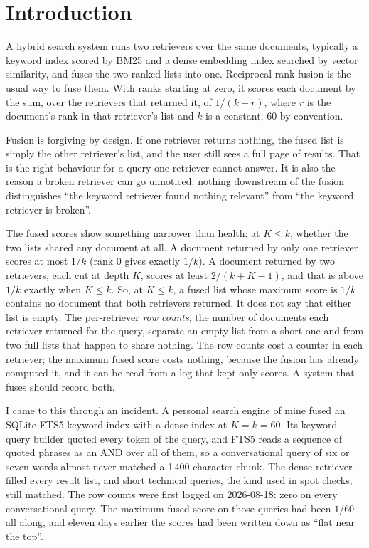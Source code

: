 \documentclass[11pt]{article}
\begin{document}
\section{Introduction}
\label{sec:intro}

A hybrid search system runs two retrievers over the same documents, typically a keyword index scored by BM25 and a dense embedding index searched by vector similarity, and fuses the two ranked lists into one. Reciprocal rank fusion \citep[RRF;][]{cormack2009rrf} is the usual way to fuse them. With ranks starting at zero, it scores each document by the sum, over the retrievers that returned it, of $1/(k+r)$, where $r$ is the document's rank in that retriever's list and $k$ is a constant, 60 by convention.

Fusion is forgiving by design. If one retriever returns nothing, the fused list is simply the other retriever's list, and the user still sees a full page of results. That is the right behaviour for a query one retriever cannot answer. It is also the reason a broken retriever can go unnoticed: nothing downstream of the fusion distinguishes ``the keyword retriever found nothing relevant'' from ``the keyword retriever is broken''.

The fused scores show something narrower than health: at $K \le k$, whether the two lists shared any document at all. A document returned by only one retriever scores at most $1/k$ (rank 0 gives exactly $1/k$). A document returned by two retrievers, each cut at depth $K$, scores at least $2/(k+K-1)$, and that is above $1/k$ exactly when $K \le k$. So, at $K \le k$, a fused list whose maximum score is $1/k$ contains no document that both retrievers returned. It does not say that either list is empty. The per-retriever \emph{row counts}, the number of documents each retriever returned for the query, separate an empty list from a short one and from two full lists that happen to share nothing. The row counts cost a counter in each retriever; the maximum fused score costs nothing, because the fusion has already computed it, and it can be read from a log that kept only scores. A system that fuses should record both.

I came to this through an incident. A personal search engine of mine fused an SQLite FTS5 keyword index with a dense index at $K = k = 60$. Its keyword query builder quoted every token of the query, and FTS5 reads a sequence of quoted phrases as an AND over all of them, so a conversational query of six or seven words almost never matched a 1\,400-character chunk. The dense retriever filled every result list, and short technical queries, the kind used in spot checks, still matched. The row counts were first logged on 2026-08-18: zero on every conversational query. The maximum fused score on those queries had been $1/60$ all along, and eleven days earlier the scores had been written down as ``flat near the top''.
\end{document}
